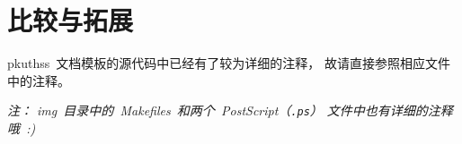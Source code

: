 \chapter{比较与拓展}

pkuthss~文档模板的源代码中已经有了较为详细的注释，
故请直接参照相应文件中的注释。

\emph
{%
	注：%
	img~目录中的~Makefiles~和两个~PostScript（\texttt{.ps}）%
	文件中也有详细的注释哦~:)
}

